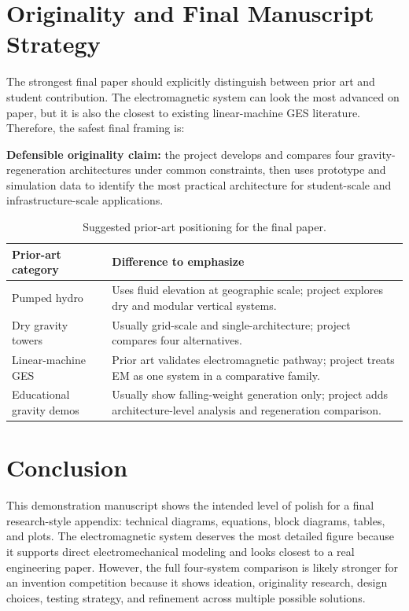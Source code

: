 \documentclass[10.5pt]{article}
\begin{document}
\clearpage
\section{Originality and Final Manuscript Strategy}
The strongest final paper should explicitly distinguish between prior art and student contribution. The electromagnetic system can look the most advanced on paper, but it is also the closest to existing linear-machine GES literature. Therefore, the safest final framing is:

\begin{tcolorbox}[enhanced,colback=blueprint!5,colframe=blueprint,boxrule=0.75pt,arc=2pt]
\textbf{Defensible originality claim:} the project develops and compares four gravity-regeneration architectures under common constraints, then uses prototype and simulation data to identify the most practical architecture for student-scale and infrastructure-scale applications.
\end{tcolorbox}

\begin{table}[H]
\centering
\caption{Suggested prior-art positioning for the final paper.}
\label{tab:prior}
\small
\begin{tabularx}{0.95\textwidth}{@{}p{}X@{}}
\toprule
Prior-art category & Difference to emphasize \\
\midrule
Pumped hydro & Uses fluid elevation at geographic scale; project explores dry and modular vertical systems. \\
Dry gravity towers & Usually grid-scale and single-architecture; project compares four alternatives. \\
Linear-machine GES & Prior art validates electromagnetic pathway; project treats EM as one system in a comparative family. \\
Educational gravity demos & Usually show falling-weight generation only; project adds architecture-level analysis and regeneration comparison. \\
\bottomrule
\end{tabularx}
\end{table}

\section{Conclusion}
This demonstration manuscript shows the intended level of polish for a final research-style appendix: technical diagrams, equations, block diagrams, tables, and plots. The electromagnetic system deserves the most detailed figure because it supports direct electromechanical modeling and looks closest to a real engineering paper. However, the full four-system comparison is likely stronger for an invention competition because it shows ideation, originality research, design choices, testing strategy, and refinement across multiple possible solutions.
\end{document}

